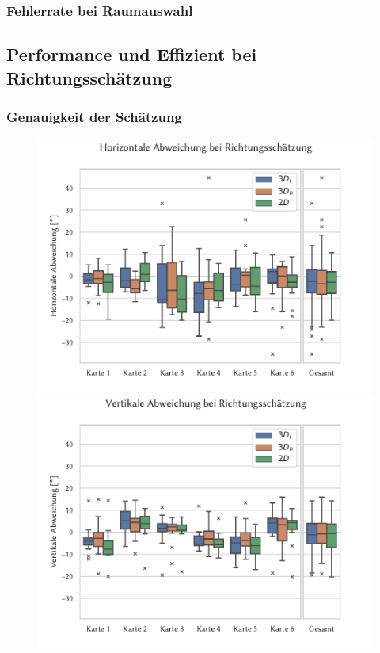 \subsubsection*{Fehlerrate bei Raumauswahl}

\subsection{Performance und Effizient bei Richtungsschätzung}

\subsubsection*{Genauigkeit der Schätzung}

\begin{figure}
    \centering
    \includegraphics[height=0.45\textheight]{figures/analysis/horiz_error}

    \includegraphics[height=0.45\textheight]{figures/analysis/vert_error}
    \caption{}
    \label{fig:boxplot_errors}
\end{figure}

